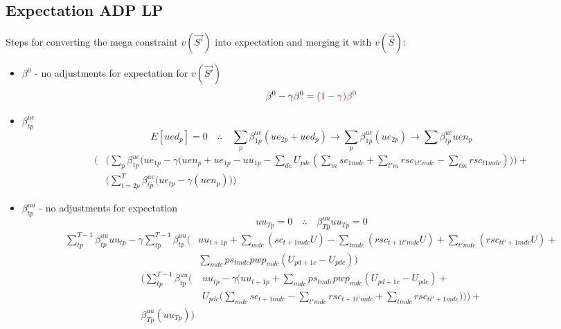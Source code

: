 \documentclass{article}
\begin{document}
\subsection{Expectation ADP LP}
Steps for converting the mega constraint $v(\vec{S'})$ into expectation and merging it with $v({\vec{S}})$:
\begin{itemize}
	\item $\beta^{0}$ - no adjustments for expectation for $v(\vec{S'})$ 
	\begin{equation*}
		\beta^{0} - \gamma \beta^{0} = \color{red} (1-\gamma) \beta^{0}
	\end{equation*}
	
	\item $\beta_{tp}^{ue}$
	\begin{equation*}
		E[ued_{p}] = 0 \quad \therefore \quad
		\sum_{p} \beta_{1p}^{ue} (ue_{2p} + ued_{p}) \rightarrow 
		\sum_{p} \beta_{1p}^{ue} (ue_{2p}) \rightarrow
		\sum \beta_{tp}^{ue} uen_{p}
	\end{equation*}
	{ \color{red} \begin{align*}
		 \Bigg( 
			& \bigg( \sum_{p} \beta_{1p}^{ue} (ue_{1p} - 
				\gamma \Big( uen_{p} + ue_{1p} - uu_{1p} - 
				\sum_{dc} U_{pdc} (\sum_{m} sc_{1mdc} + \sum_{t'm} rsc_{1t'mdc} - \sum_{tm} rsc_{t1mdc}) \Big) \bigg) + \\
			& \bigg(\sum_{t=2p}^{T} \beta_{tp}^{ue} (ue_{tp} - \gamma (uen_{p}) \bigg) \Bigg)
	\end{align*} }
		
	\item $\beta_{tp}^{uu}$ - no adjustments for expectation
	\begin{equation*}
		uu_{Tp} = 0 \quad \therefore \quad \beta_{Tp}^{uu} uu_{Tp} = 0
	\end{equation*}
	\begin{align*}
		\sum_{tp}^{T-1} \beta_{tp}^{uu} uu_{tp} - \gamma \sum_{tp}^{T-1} \beta_{tp}^{uu} \bigg( 
					& uu_{t+1p} + \sum_{mdc} (sc_{t+1mdc}U)  - \sum_{tmdc} (rsc_{t+1t'mdc} U) + \sum_{t'mdc} (rsc_{tt'+1mdc} U) + \\ 
					&\sum_{mdc} ps_{tmdc}pwp_{mdc} (U_{pd+1c} - U_{pdc}) \bigg)
	\end{align*}
	{ \color{red} \begin{align*}
		 \Bigg( \sum_{tp}^{T-1} \beta_{tp}^{uu} \bigg( & 
		 	uu_{tp}	 - \gamma \Big( uu_{t+1p} + \sum_{mdc} ps_{tmdc}pwp_{mdc} (U_{pd+1c} - U_{pdc}) + \\
			& U_{pdc} \big( \sum_{mdc} sc_{t+1mdc}  - \sum_{t'mdc} rsc_{t+1t'mdc} + \sum_{tmdc} rsc_{tt'+1mdc} \big) \Big) \bigg) + \\
		\beta_{Tp}^{uu} (uu_{Tp}) \Bigg)
	\end{align*} }
	

\end{itemize}
\end{document}
